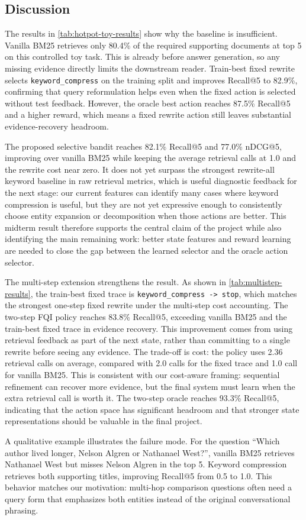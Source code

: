 \subsection{Discussion}
\label{section:exp:discussion}
The results in \cref{tab:hotpot-toy-results} show why the baseline is insufficient. Vanilla BM25 retrieves only 80.4\% of the required supporting documents at top 5 on this controlled toy task. This is already before answer generation, so any missing evidence directly limits the downstream reader. Train-best fixed rewrite selects \texttt{keyword\_compress} on the training split and improves Recall@5 to 82.9\%, confirming that query reformulation helps even when the fixed action is selected without test feedback. However, the oracle best action reaches 87.5\% Recall@5 and a higher reward, which means a fixed rewrite action still leaves substantial evidence-recovery headroom.

The proposed selective bandit reaches 82.1\% Recall@5 and 77.0\% nDCG@5, improving over vanilla BM25 while keeping the average retrieval calls at 1.0 and the rewrite cost near zero. It does not yet surpass the strongest rewrite-all keyword baseline in raw retrieval metrics, which is useful diagnostic feedback for the next stage: our current features can identify many cases where keyword compression is useful, but they are not yet expressive enough to consistently choose entity expansion or decomposition when those actions are better. This midterm result therefore supports the central claim of the project while also identifying the main remaining work: better state features and reward learning are needed to close the gap between the learned selector and the oracle action selector.

The multi-step extension strengthens the result. As shown in \cref{tab:multistep-results}, the train-best fixed trace is \texttt{keyword\_compress -> stop}, which matches the strongest one-step fixed rewrite under the multi-step cost accounting. The two-step FQI policy reaches 83.8\% Recall@5, exceeding vanilla BM25 and the train-best fixed trace in evidence recovery. This improvement comes from using retrieval feedback as part of the next state, rather than committing to a single rewrite before seeing any evidence. The trade-off is cost: the policy uses 2.36 retrieval calls on average, compared with 2.0 calls for the fixed trace and 1.0 call for vanilla BM25. This is consistent with our cost-aware framing: sequential refinement can recover more evidence, but the final system must learn when the extra retrieval call is worth it. The two-step oracle reaches 93.3\% Recall@5, indicating that the action space has significant headroom and that stronger state representations should be valuable in the final project.

A qualitative example illustrates the failure mode. For the question ``Which author lived longer, Nelson Algren or Nathanael West?'', vanilla BM25 retrieves Nathanael West but misses Nelson Algren in the top 5. Keyword compression retrieves both supporting titles, improving Recall@5 from 0.5 to 1.0. This behavior matches our motivation: multi-hop comparison questions often need a query form that emphasizes both entities instead of the original conversational phrasing.

\FloatBarrier
